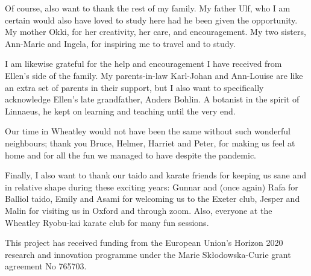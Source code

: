 Of course, also want to thank the rest of my family. My father Ulf, who I am certain would also have loved to study here had he been given the opportunity. My mother Okki, for her creativity, her care, and encouragement. My two sisters, Ann-Marie and Ingela, for inspiring me to travel and to study.

I am likewise grateful for the help and encouragement I have received from Ellen's side of the family. My parents-in-law Karl-Johan and Ann-Louise are like an extra set of parents in their support, but I also want to specifically acknowledge Ellen's late grandfather, Anders Bohlin. A botanist in the spirit of Linnaeus, he kept on learning and teaching until the very end.

Our time in Wheatley would not have been the same without such wonderful neighbours; thank you Bruce, Helmer, Harriet and Peter, for making us feel at home and for all the fun we managed to have despite the pandemic.

Finally, I also want to thank our taido and karate friends for keeping us sane and in relative shape during these exciting years: Gunnar and (once again) Rafa for Balliol taido, Emily and Asami for welcoming us to the Exeter club, Jesper and Malin for visiting us in Oxford and through zoom. Also, everyone at the Wheatley Ryobu-kai karate club for many fun sessions.




This project has received funding from the European Union's Horizon 2020 research and innovation programme under the Marie Skłodowska-Curie grant agreement No 765703.

